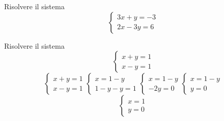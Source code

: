 \begin{exercise}[no solution]
	Risolvere il sistema 
	\[
	\begin{cases}
		3x+y=-3\\
		2x-3y=6
	\end{cases}
	\]
\end{exercise}
\begin{exercise}{}
	Risolvere il sistema 
	\[
	\begin{cases}
		x+y=1\\
		x-y=1
	\end{cases}
	\]
	\tcblower
	\[
	\begin{cases}
		x+y=1\\
		x-y=1
	\end{cases}
	\begin{cases}
		x=1-y\\
		1-y-y=1
	\end{cases}
	\begin{cases}
		x=1-y\\
		-2y=0
	\end{cases}
	\begin{cases}
	x=1-y\\
	y=0
	\end{cases}
	\]
	\[
	\begin{cases}
		x=1\\
		y=0
	\end{cases}
	\]
\end{exercise}
